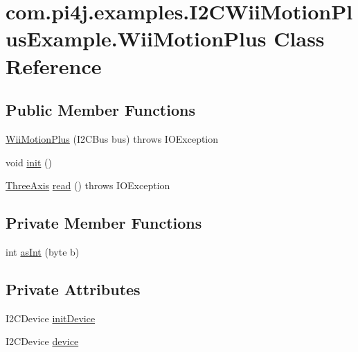 \hypertarget{classcom_1_1pi4j_1_1examples_1_1I2CWiiMotionPlusExample_1_1WiiMotionPlus}{}\section{com.\+pi4j.\+examples.\+I2\+C\+Wii\+Motion\+Plus\+Example.\+Wii\+Motion\+Plus Class Reference}
\label{classcom_1_1pi4j_1_1examples_1_1I2CWiiMotionPlusExample_1_1WiiMotionPlus}
\subsection*{Public Member Functions}
\begin{DoxyCompactItemize}
\item 
\hyperlink{classcom_1_1pi4j_1_1examples_1_1I2CWiiMotionPlusExample_1_1WiiMotionPlus_abc6322249b2383c60a87edc5d38dc38f}{Wii\+Motion\+Plus} (I2\+C\+Bus bus)  throws I\+O\+Exception 
\item 
void \hyperlink{classcom_1_1pi4j_1_1examples_1_1I2CWiiMotionPlusExample_1_1WiiMotionPlus_a1344433cd4b813caab9433b254a1c9e3}{init} ()
\item 
\hyperlink{classcom_1_1pi4j_1_1examples_1_1I2CWiiMotionPlusExample_1_1ThreeAxis}{Three\+Axis} \hyperlink{classcom_1_1pi4j_1_1examples_1_1I2CWiiMotionPlusExample_1_1WiiMotionPlus_ac46ff1a05559eb5780ca1e28255d8cea}{read} ()  throws I\+O\+Exception 
\end{DoxyCompactItemize}
\subsection*{Private Member Functions}
\begin{DoxyCompactItemize}
\item 
int \hyperlink{classcom_1_1pi4j_1_1examples_1_1I2CWiiMotionPlusExample_1_1WiiMotionPlus_a5706e1080e6935ba9ed9516db278ee4b}{as\+Int} (byte b)
\end{DoxyCompactItemize}
\subsection*{Private Attributes}
\begin{DoxyCompactItemize}
\item 
I2\+C\+Device \hyperlink{classcom_1_1pi4j_1_1examples_1_1I2CWiiMotionPlusExample_1_1WiiMotionPlus_a8caa866617964bc9c0f60980d8f5ddec}{init\+Device}
\item 
I2\+C\+Device \hyperlink{classcom_1_1pi4j_1_1examples_1_1I2CWiiMotionPlusExample_1_1WiiMotionPlus_a5785ab1b5e1108c36e1286c489a3684b}{device}
\end{DoxyCompactItemize}


